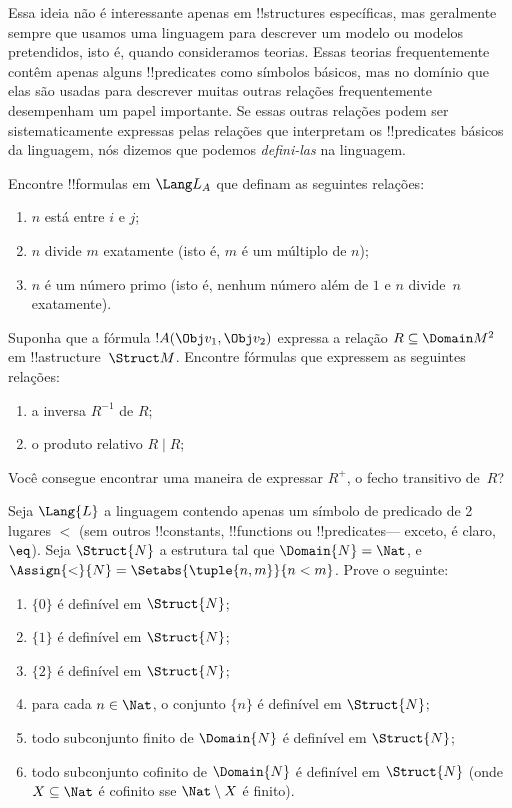\documentclass[../../../include/open-logic-section]{subfiles}
\begin{document}
\begin{explain}
Essa ideia não é interessante apenas em !!{structure}s específicas, mas
geralmente sempre que usamos uma linguagem para descrever um modelo ou
modelos pretendidos, isto é, quando consideramos teorias.  Essas teorias frequentemente
contêm apenas alguns !!{predicate}s como símbolos básicos, mas no domínio que elas
são usadas para descrever muitas outras relações frequentemente desempenham um
papel importante.  Se essas outras relações podem ser sistematicamente expressas pelas
relações que interpretam os !!{predicate}s básicos da linguagem, nós
dizemos que podemos \emph{defini-las} na linguagem.
\end{explain}

\begin{prob}
Encontre !!{formula}s em $\Lang L_A$ que definam as seguintes relações:
\begin{enumerate}
\item $n$ está entre $i$ e $j$;
\item $n$ divide $m$ exatamente (isto é, $m$ é um múltiplo de $n$);
\item $n$ é um número primo (isto é, nenhum número além de $1$ e $n$ divide~$n$
  exatamente).
\end{enumerate}
\end{prob}

\begin{prob}
Suponha que a fórmula $!A(\Obj v_1, \Obj v_2)$ expressa a relação $R
\subseteq \Domain M^2$ em !!a{structure}~$\Struct M$.  Encontre fórmulas
que expressem as seguintes relações:
\begin{enumerate}
\item a inversa $R^{-1}$ de $R$;
\item o produto relativo $R \mid R$;
\end{enumerate}
Você consegue encontrar uma maneira de expressar $R^+$, o fecho transitivo de~$R$?
\end{prob}

\begin{prob}
Seja $\Lang{L}$ a linguagem contendo apenas um símbolo de predicado de 2 lugares
$<$ (sem outros !!{constant}s, !!{function}s ou !!{predicate}s---
exceto, é claro,~$\eq$). Seja $\Struct{N}$ a estrutura tal que
$\Domain{N} = \Nat$, e $\Assign{<}{N} = \Setabs{\tuple{n,m}}{n <
  m}$. Prove o seguinte:
\begin{enumerate}
\item $\{ 0 \}$ é definível em $\Struct{N}$;
\item $\{ 1 \}$ é definível em $\Struct{N}$;
\item $\{ 2 \}$ é definível em $\Struct{N}$;
\item para cada $n \in \Nat$, o conjunto $\{ n \}$ é definível em
  $\Struct{N}$;
\item todo subconjunto finito de $\Domain{N}$ é definível em
  $\Struct{N}$;
\item todo subconjunto cofinito de $\Domain{N}$ é definível em
  $\Struct{N}$ (onde $X \subseteq \Nat$ é cofinito sse
  $\Nat \setminus X$ é finito).
\end{enumerate}
\end{prob}
\end{document}
